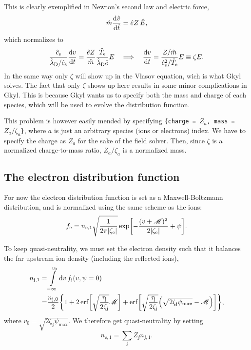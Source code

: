 \documentclass[11pt,a4paper, 
swedish, english %
]{article}
\begin{document}
This is clearly exemplified in Newton's second law and electric force,
\begin{equation}\label{eq:hat_NewtonII}
\hat{m}\dv{\hat{v}}{\hat{t}}=\hat{e}Z\,\hat{E},
\end{equation}
which normalizes to
\begin{equation}
\frac{\hat{c}_{\text{s}}}{\hat{\lambda}_{\text{D}}/\hat{c}_{\text{s}}}\dv{v}{t}
=\frac{\hat{e}Z}{\hat{m}} \frac{\hat{T}_{\mathrm{e}}}{\hat{\lambda}_{\text{D}}\hat{e}}E
\quad\Longrightarrow\quad
\dv{v}{t}
=\frac{Z/\hat{m}}{\hat{c}_{\text{s}}^2/\hat{T}_{\mathrm{e}}} E
\equiv \zeta E.
\end{equation}
In the same way only $\zeta$ will show up in the Vlasov equation, wich
is what Gkyl solves. The fact that only $\zeta$ shows up here results
in some minor complications in Gkyl. This is because Gkyl wants us to
specify both the mass and charge of each species, which will
be used to evolve the distribution function.

This problem is however
easily mended by specifying 
\texttt{\{charge~=~$Z_a$,~mass~=~$Z_{a}/\zeta_{a}$\}}, where $a$ is
just an arbitrary species (ions or electrons) index. We have to
specify the charge as $Z_a$ for the sake of the field solver. Then,
since $\zeta$ is a normalized charge-to-mass ratio, $Z_{a}/\zeta_{a}$
is a normalized mass.  

\subsection{The electron distribution function}
For now the electron distribution function is set as a
Maxwell-Boltzmann distribution, and is normalized using the same
scheme as the ions:
\begin{equation}\label{eq:fe}
f_{\mathrm{e}} = n_{\mathrm{e},1}\sqrt{\frac{1}{2\pi|\zeta_{\mathrm{e}}|}}
\exp[-\frac{(v+\mathscr{M})^2}{2|\zeta_{\mathrm{e}}|}+\psi].
\end{equation}

To keep quasi-neutrality, we must set the electron density such that
it balances the far upstream ion density (including the reflected
ions),
\begin{equation}\label{eq:nj1}
\begin{aligned}
n_{\jj,1} =& \int_{-\infty}^{v_0}\rd{v}\,f_{\jj}(v,\psi=0)\\
=&\frac{n_{\jj,0}}{2}
\qty{
  1+2\erf[\sqrt{\frac{\tau_{\jj}}{2\zeta_{\jj}}}\M]
  +\erf[\sqrt{\frac{\tau_{\jj}}{2\zeta_{\jj}}}
  \qty(\sqrt{2\zeta_{\jj}\psi_{\max}}-\M)]
},
\end{aligned}
\end{equation}
where $v_0=\sqrt{2\zeta_{\jj}\psi_{\max}}$. We therefore get
quasi-neutrality by setting
\begin{equation}\label{eq:ne1}
n_{\ee,1} = \sum_{\jj} Z_{\jj}n_{\jj,1}.
\end{equation}
\end{document}
